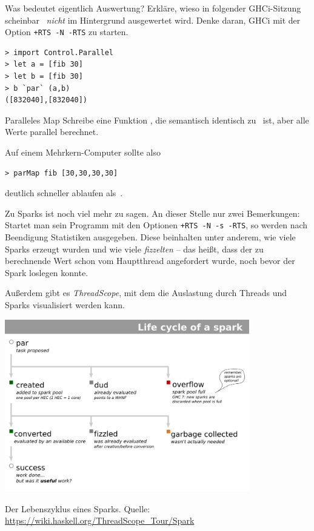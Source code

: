\documentclass{uebblatt}
\begin{document}
\begin{aufgabe}{Was bedeutet eigentlich Auswertung?}
Erkläre, wieso in folgender GHCi-Sitzung scheinbar~
\emph{nicht} im Hintergrund ausgewertet wird. Denke daran, GHCi mit der Option
\texttt{+RTS -N -RTS} zu starten.

\begin{verbatim}
> import Control.Parallel
> let a = [fib 30]
> let b = [fib 30]
> b `par` (a,b)
([832040],[832040])
\end{verbatim}
\end{aufgabe}

\begin{aufgabe}{Paralleles Map}
Schreibe eine Funktion , die
semantisch identisch zu~ ist, aber alle Werte parallel
berechnet.

Auf einem Mehrkern-Computer sollte also
\begin{verbatim}
> parMap fib [30,30,30,30]
\end{verbatim}
deutlich schneller ablaufen als~.
\end{aufgabe}

Zu Sparks ist noch viel mehr zu sagen. An dieser Stelle nur zwei Bemerkungen:
Startet man sein Programm mit den Optionen \texttt{+RTS -N -s -RTS}, so werden
nach Beendigung Statistiken ausgegeben. Diese beinhalten unter anderem, wie
viele Sparks erzeugt wurden und wie viele \emph{fizzelten} -- das heißt, dass
der zu berechnende Wert schon vom Hauptthread angefordert wurde, noch bevor der
Spark loslegen konnte.

Außerdem gibt es \emph{ThreadScope}, mit dem die Auslastung durch Threads und
Sparks visualisiert werden kann.

\begin{center}
  \href{https://wiki.haskell.org/ThreadScope_Tour/Spark}{\includegraphics[width=0.8\textwidth]{Spark-lifecycle}}

  Der Lebenszyklus eines Sparks.
  Quelle: \url{https://wiki.haskell.org/ThreadScope_Tour/Spark}
\end{center}
\end{document}
